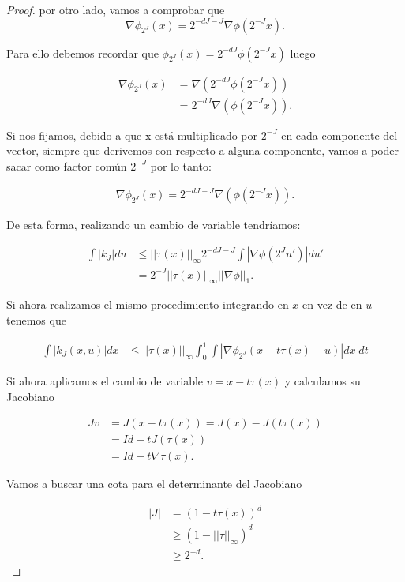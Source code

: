 \begin{proof}
  \noindent por otro lado, vamos a comprobar que 
  $$\nabla\phi_{2^J}(x)=2^{-dJ-J} \nabla \phi(2^{-J}x).$$

  \noindent Para ello debemos recordar que $\phi_{2^J}(x)=2^{-dJ}\phi(2^{-J}x)$ luego

  \begin{align*}
    \nabla \phi_{2^J}(x) &= \nabla(2^{-dJ}\phi(2^{-J}x)) \\
    &= 2^{-dJ} \nabla(\phi(2^{-J}x)).
  \end{align*}

  \noindent Si nos fijamos, debido a que x está multiplicado por $2^{-J}$ en cada componente del vector, siempre que derivemos con respecto a alguna componente, vamos a poder sacar como factor común $2^{-J}$ por lo tanto:

  \begin{align*}
    \nabla \phi_{2^J}(x) = 2^{-dJ-J} \nabla(\phi(2^{-J}x)).
  \end{align*}

  \noindent De esta forma, realizando un cambio de variable tendríamos: 

  \begin{align*}
    \int |k_J| du &\leq ||\tau(x)||_\infty  2^{-dJ-J} \int \left| \nabla \phi (2^J u')\right|du' \\
    & = 2^{-J} ||\tau(x)||_\infty ||\nabla\phi||_1. 
  \end{align*}

  \noindent Si ahora realizamos el mismo procedimiento integrando en $x$ en vez de en $u$ tenemos que 

  \begin{align*}
    \int |k_J(x,u)| dx &\leq ||\tau(x)||_\infty \int_0^1 \int \left| \nabla \phi_{2^J} (x-t\tau(x)-u)\right| dx \; dt
  \end{align*}

  \noindent Si ahora aplicamos el cambio de variable $v=x - t\tau(x)$ y calculamos su Jacobiano

  \begin{align*}
    Jv& =J(x-t\tau(x))=J(x)-J(t\tau(x)) \\
    & = Id - tJ(\tau(x)) \\
    & = Id - t\nabla \tau(x).
  \end{align*}

  \noindent Vamos a buscar una cota para el determinante del Jacobiano

  \begin{align*}
    |J| & =(1-t\tau(x))^d \\
    & \geq (1-||\tau||_\infty)^d \\
    & \geq 2^{-d}.
  \end{align*}


\end{proof}
